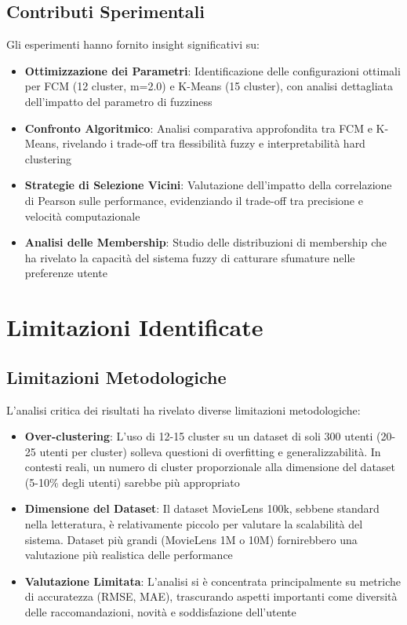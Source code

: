 \subsection{Contributi Sperimentali}

Gli esperimenti hanno fornito insight significativi su:

\begin{itemize}
    \item \textbf{Ottimizzazione dei Parametri}: Identificazione delle configurazioni ottimali per FCM (12 cluster, m=2.0) e K-Means (15 cluster), con analisi dettagliata dell'impatto del parametro di fuzziness
    
    \item \textbf{Confronto Algoritmico}: Analisi comparativa approfondita tra FCM e K-Means, rivelando i trade-off tra flessibilità fuzzy e interpretabilità hard clustering
    
    \item \textbf{Strategie di Selezione Vicini}: Valutazione dell'impatto della correlazione di Pearson sulle performance, evidenziando il trade-off tra precisione e velocità computazionale
    
    \item \textbf{Analisi delle Membership}: Studio delle distribuzioni di membership che ha rivelato la capacità del sistema fuzzy di catturare sfumature nelle preferenze utente
\end{itemize}

\section{Limitazioni Identificate}

\subsection{Limitazioni Metodologiche}

L'analisi critica dei risultati ha rivelato diverse limitazioni metodologiche:

\begin{itemize}
    \item \textbf{Over-clustering}: L'uso di 12-15 cluster su un dataset di soli 300 utenti (20-25 utenti per cluster) solleva questioni di overfitting e generalizzabilità. In contesti reali, un numero di cluster proporzionale alla dimensione del dataset (5-10\% degli utenti) sarebbe più appropriato
    
    \item \textbf{Dimensione del Dataset}: Il dataset MovieLens 100k, sebbene standard nella letteratura, è relativamente piccolo per valutare la scalabilità del sistema. Dataset più grandi (MovieLens 1M o 10M) fornirebbero una valutazione più realistica delle performance
    
    \item \textbf{Valutazione Limitata}: L'analisi si è concentrata principalmente su metriche di accuratezza (RMSE, MAE), trascurando aspetti importanti come diversità delle raccomandazioni, novità e soddisfazione dell'utente
\end{itemize}


